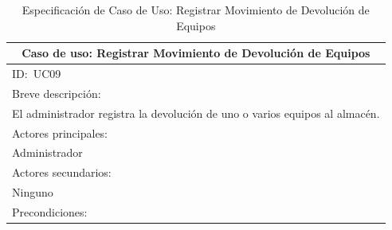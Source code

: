 \documentclass[stu, 12pt, letterpaper, donotrepeattitle, floatsintext, natbib]{apa7}
\begin{document}
\newpage
\begin{longtable}{@{} p{16.5cm} @{}}
    \caption{Especificación de Caso de Uso: Registrar Movimiento de Devolución de Equipos}\label{tab:UC09}                                                                                                                           \\ \toprule
    \multicolumn{1}{c}{Caso de uso: Registrar Movimiento de Devolución de Equipos}                                                                                                                                                   \\ \midrule
    ID:~UC09                                                                                                                                                                                                                         \\ \midrule
    Breve descripción:                                                                                                                                                                                                               \\
    El administrador registra la devolución de uno o varios equipos al almacén.                                                                                                                                                      \\ \midrule
    Actores principales:                                                                                                                                                                                                             \\
    Administrador                                                                                                                                                                                                                    \\ \midrule
    Actores secundarios:                                                                                                                                                                                                             \\
    Ninguno                                                                                                                                                                                                                          \\ \midrule
    Precondiciones:                                                                                                                                                                                                                  \\

\end{longtable}
\end{document}
